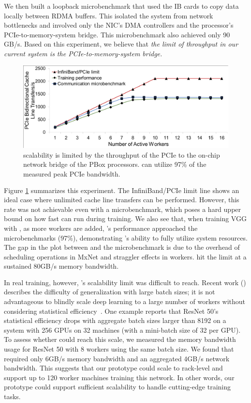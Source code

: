We then built a loopback microbenchmark that used the IB cards to copy data locally between RDMA buffers. This isolated the system from network bottlenecks and involved only the NIC's DMA controllers and the processor's PCIe-to-memory-system bridge. This microbenchmark also achieved only 90 GB/s. Based on this experiment, we believe that \textit{the limit of throughput in our current \phub system is the PCIe-to-memory-system bridge.}

\begin{figure}[t!]
    \centering
	\includegraphics[width=.7\linewidth,trim=3 2 2 2,clip]{Figures/Scalability.pdf}
	\caption{\pbox{} scalability is limited by the throughput of the PCIe to the on-chip network bridge of the PBox processors. \phub{} can utilize 97\% of the measured peak PCIe bandwidth.}
	\label{fig:scalablity}
\end{figure}

Figure \ref{fig:scalablity} summarizes this experiment. The InfiniBand/PCIe limit line shows an ideal case where unlimited cache line transfers can be performed. However, this rate was not achievable even with a microbenchmark, which poses a hard upper bound on how fast \phub can run during training. We also see that, when training VGG with , as more workers are added, \pbox{}'s performance approached the microbenchmarks (97\%), demonstrating \phub{}'s ability to fully utilize system resources. The gap in the plot between \pbox and the microbenchmark %
is due to the overhead of scheduling operations in MxNet and straggler effects in workers. \pbox{} hit the limit at a sustained 80GB/s memory bandwidth.

In real training, however, \pbox{}'s scalability limit was difficult to reach. Recent work (\cite{keskar2016large, lecun1524efficient}) describes the difficulty of generalization with large batch sizes; it is not advantageous to blindly scale deep learning to a large number of workers without considering statistical efficiency~\cite{youspeeding, koliousiscrossbow}. One example \cite{ImageNetIn1Hour} reports that ResNet 50's statistical efficiency drops with aggregate batch sizes larger than 8192 on a system with 256 GPUs on 32 machines (with a mini-batch size of 32 per GPU). To assess whether \pbox could reach this scale, we measured the memory bandwidth usage for ResNet 50 with 8 workers using the same batch size. We found that \pbox required only 6GB/s memory bandwidth and an aggregated 4GB/s network bandwidth. This suggests that our \pbox prototype could scale to rack-level and support up to 120 worker machines training this network. In other words, our prototype could support sufficient scalability to handle cutting-edge training tasks.

